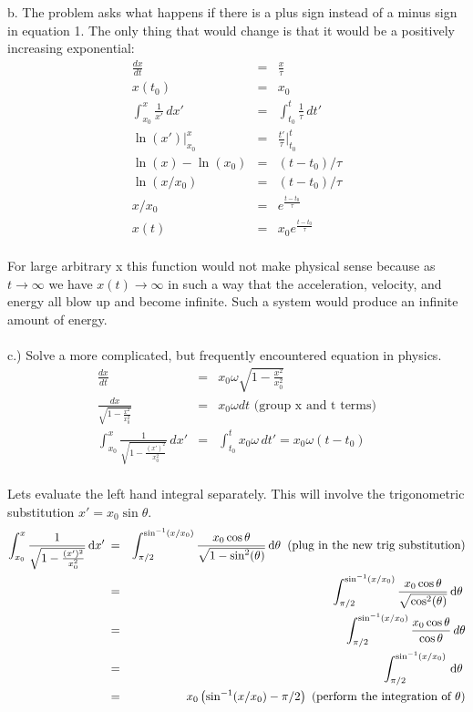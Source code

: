 \documentclass[11pt]{amsart}
\begin{document}
b. The problem asks what happens if there is a plus sign instead of a minus sign in equation 1. The only thing that would change is that it would be a positively increasing exponential: \\ 
\begin{eqnarray*} 
\frac{dx}{dt} &=& \frac{x}{\tau} \\
x(t_{0}) &=& x_{0} \\
\int^{x}_{x_{0}}\frac{1}{x'}\,dx' &=& \int^{t}_{t_{0}}\frac{1}{\tau}\,dt' \\
\ln(x')|^{x}_{x_{0}} &=&\frac{t'}{\tau}|^{t}_{t_{0}} \\
\ln(x) - \ln(x_{0}) &=& (t - t_{0})/\tau \\
\ln(x/x_{0}) &=& (t - t_{0})/\tau \\
x/x_{0} &=& e^{\frac{t-t_{0}}{\tau}} \\
x(t) &=& x_{0}e^{\frac{t-t_{0}}{\tau}} 
\end{eqnarray*} \\
For large arbitrary x this function would not make physical sense because as $t \to \infty$ we have $x(t) \to \infty$ in such a way that the acceleration, velocity, and energy all blow up and become infinite. Such a system would produce an infinite amount of energy. 
\\  \\
c.) Solve a more complicated, but frequently encountered equation in physics. \\ 
\begin{eqnarray*} 
\frac{dx}{dt} &=& x_{0}\omega{}\sqrt{1 - \frac{x^{2}}{x_{0}^{2}}} \\
\frac{dx}{\sqrt{1 - \frac{x^{2}}{x_{0}^{2}}}} &=& x_{0}\omega{}dt \mbox{ (group x and t terms)} \\
\int^{x}_{x_{0}}\frac{1}{\sqrt{1 - \frac{(x')^{2}}{x_{0}^{2}}}}\,dx' &=& \int^{t}_{t_{0}}x_{0}\omega\,dt' = x_{0}\omega{}(t - t_{0}) 
\end{eqnarray*} \\
Lets evaluate the left hand integral separately. This will involve the trigonometric substitution $x' = x_0 \sin{\theta}$.
\begin{eqnarray*} 
\int^{x}_{x_0} 
\frac{1}{\sqrt{1 - \frac{(x')^{2}}{x_{0}^{2}}}}
\, \mathrm{d}x' \: 
&=& \int^{\sin^{-1}(x/x_0)}_{\pi/2} 
\frac{x_{0}\cos{\theta}}{\sqrt{1 - \sin^{2}(\theta)}} \, \mathrm{d}\theta \:  
\mbox{ (plug in the new trig substitution)} 
\\
&=& \int^{\sin^{-1}(x/x_0)}_{\pi/2} 
\frac{x_{0}\cos{\theta}}{\sqrt{\cos^{2}(\theta)}}\, \mathrm{d}\theta \:
\\
&=& \int^{\sin^{-1}(x/x_0)}_{\pi/2} 
\frac{x_{0}\cos{\theta}}{\cos{\theta}}\,d\theta 
\\
&=& \int^{\sin^{-1}(x/x_0)}_{\pi/2} 
\, \mathrm{d}\theta \: 
\\
&=& x_{0} \left( \sin^{-1}(x/x_0) - \pi/2 \right)   \mbox{ (perform the integration of $\theta$)} 
\end{eqnarray*}  \\
\end{document}
